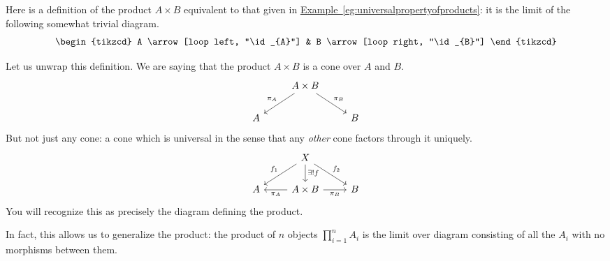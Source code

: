 \documentclass[notes.tex]{subfiles}
\begin{document}
\begin{example}
  Here is a definition of the product $A \times B$ equivalent to that given in \hyperref[eg:universalpropertyofproducts]{Example~\ref*{eg:universalpropertyofproducts}}: it is the limit of the following somewhat trivial diagram.
  \begin{equation*}
    \begin{tikzcd}
      A
      \arrow[loop left, "\id_{A}"]
      & B
      \arrow[loop right, "\id_{B}"]
    \end{tikzcd}
  \end{equation*}

  Let us unwrap this definition. We are saying that the product $A \times B$ is a cone over $A$ and $B$.
  \begin{equation*}
    \begin{tikzcd}
      & A \times B
      \arrow[dl, swap, "\pi_{A}"]
      \arrow[dr, "\pi_{B}"]
      \\
      A & & B
    \end{tikzcd}
  \end{equation*}
  But not just any cone: a cone which is universal in the sense that any \emph{other} cone factors through it uniquely.
  \begin{equation*}
    \begin{tikzcd}
      & X
      \arrow[dl, swap, "f_{1}"]
      \arrow[dr, "f_{2}"]
      \arrow[d, "\exists!f"]
      \\
      A
      & A \times B
      \arrow[l, "\pi_{A}"]
      \arrow[r, swap, "\pi_{B}"]
      & B
    \end{tikzcd}
  \end{equation*}
  You will recognize this as precisely the diagram defining the product.

  In fact, this allows us to generalize the product: the product of $n$ objects $\prod_{i=1}^{n} A_{i}$ is the limit over diagram consisting of all the $A_{i}$ with no morphisms between them.
\end{example}
\end{document}
